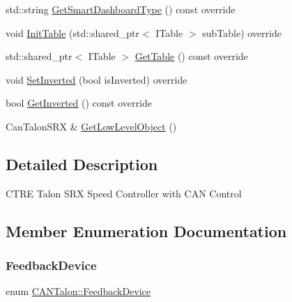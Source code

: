 \begin{DoxyCompactItemize}
\item 
std\+::string \hyperlink{class_c_a_n_talon_adedfa57e6f2ef854ec07c0587a37a436}{Get\+Smart\+Dashboard\+Type} () const override
\item 
void \hyperlink{class_c_a_n_talon_ae0a828862cd614d2fa372911205bd0ca}{Init\+Table} (std\+::shared\+\_\+ptr$<$ I\+Table $>$ sub\+Table) override
\item 
std\+::shared\+\_\+ptr$<$ I\+Table $>$ \hyperlink{class_c_a_n_talon_ab02a755b0e649792fd50eadeb6868ff5}{Get\+Table} () const override
\item 
void \hyperlink{class_c_a_n_talon_ab153d39a2a439189af4667ce0364e846}{Set\+Inverted} (bool is\+Inverted) override
\item 
bool \hyperlink{class_c_a_n_talon_aa85609e0aadcd710012b912591bd65d8}{Get\+Inverted} () const override
\item 
Can\+Talon\+S\+RX \& \hyperlink{class_c_a_n_talon_ad8a7985b0adfe2a10a379254efe28193}{Get\+Low\+Level\+Object} ()
\end{DoxyCompactItemize}


\subsection{Detailed Description}
C\+T\+RE Talon S\+RX Speed Controller with C\+AN Control 

\subsection{Member Enumeration Documentation}
\mbox{\label{class_c_a_n_talon_a4a8af675a7712f305d17be2b825005e3}} 
\subsubsection{\texorpdfstring{Feedback\+Device}{FeedbackDevice}}
{\footnotesize\ttfamily enum \hyperlink{class_c_a_n_talon_a4a8af675a7712f305d17be2b825005e3}{C\+A\+N\+Talon\+::\+Feedback\+Device}}

